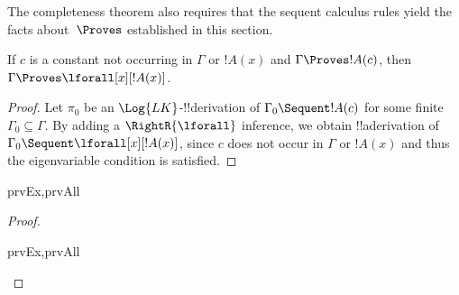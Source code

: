 \documentclass[../../../include/open-logic-section]{subfiles}
\begin{document}

\begin{explain}
  The completeness theorem also requires that the sequent calculus
  rules yield the facts about~$\Proves$ established in this
  section.
\end{explain}

\begin{thm}
 If $c$ is a constant not occurring
in $\Gamma$ or $!A(x)$ and $\Gamma \Proves !A(c)$, then $\Gamma
\Proves \lforall[x][!A(x)]$.
\end{thm}

\begin{proof}
Let $\pi_0$ be an $\Log{LK}$-!!{derivation} of $\Gamma_0 \Sequent !A(c)$
for some finite $\Gamma_0 \subseteq \Gamma$.  By adding a
$\RightR{\lforall}$ inference, we obtain !!a{derivation} of $\Gamma_0 \Sequent
\lforall[x][!A(x)]$, since $c$ does not occur in $\Gamma$ or $!A(x)$
and thus the eigenvariable condition is satisfied.
\end{proof}

\begin{prop}
\begin{tagenumerate}{prvEx,prvAll}
\end{tagenumerate}
\end{prop}

\begin{proof}
\begin{tagenumerate}{prvEx,prvAll}
\end{tagenumerate}
\end{proof}
\end{document}
